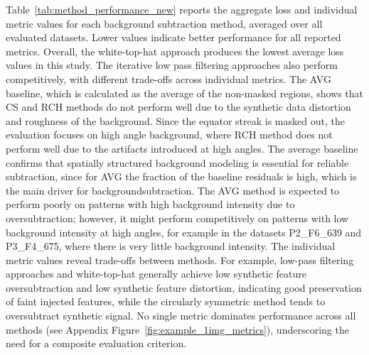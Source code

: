 \documentclass[iucr]{iucrjournals}
\begin{document}
Table~\ref{tab:method_performance_new} reports the aggregate loss and individual metric values for each background subtraction method, averaged over all evaluated datasets. Lower values indicate better performance for all reported metrics. Overall, the white-top-hat approach produces the lowest average loss values in this study. The iterative low pass filtering approaches also perform competitively, with different trade-offs across individual metrics. The AVG baseline, which is calculated as the average of the non-masked regions, shows that CS and RCH methods do not perform well due to the synthetic data distortion and roughness of the background. Since the equator streak is masked out, the evaluation focuses on high angle background, where RCH method does not perform well due to the artifacts introduced at high angles. The average baseline confirms that spatially structured background modeling is essential for reliable subtraction, since for AVG the fraction of the baseline residuals is high, which is the main driver for backgroundsubtraction. The AVG method is expected to perform poorly on patterns with high background intensity due to oversubtraction; however, it might perform competitively on patterns with low background intensity at high angles, for example in the datasets P2\_F6\_639 and P3\_F4\_675, where there is very little background intensity. The individual metric values reveal trade-offs between methods. For example, low-pass filtering approaches and white-top-hat generally achieve low synthetic feature oversubtraction and low synthetic feature distortion, indicating good preservation of faint injected features, while the circularly symmetric method tends to oversubtract synthetic signal. No single metric dominates performance across all methods (see Appendix Figure~\ref{fig:example_1img_metrics}), underscoring the need for a composite evaluation criterion.
\end{document}
